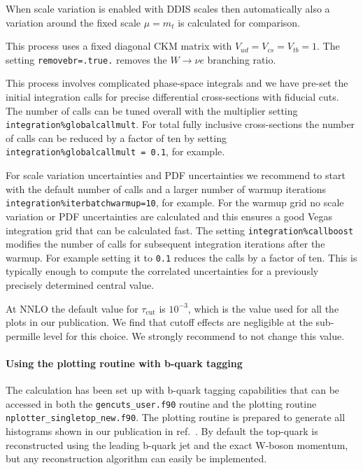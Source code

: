 When scale variation is enabled with DDIS scales then automatically also
a variation around the fixed scale \(\mu=m_t\) is calculated for
comparison.

This process uses a fixed diagonal CKM matrix with
\(V_{ud}=V_{cs}=V_{tb}=1\). The setting \texttt{removebr=.true.} removes
the \(W\to \nu e\) branching ratio.

This process involves complicated phase-space integrals and we have
pre-set the initial integration calls for precise differential
cross-sections with fiducial cuts. The number of calls can be tuned
overall with the multiplier setting
\texttt{integration\%globalcallmult}. For total fully inclusive
cross-sections the number of calls can be reduced by a factor of ten by
setting \texttt{integration\%globalcallmult\ =\ 0.1}, for example.

For scale variation uncertainties and PDF uncertainties we recommend to
start with the default number of calls and a larger number of warmup
iterations \texttt{integration\%iterbatchwarmup=10}, for example. For
the warmup grid no scale variation or PDF uncertainties are calculated
and this ensures a good Vegas integration grid that can be calculated
fast. The setting \texttt{integration\%callboost} modifies the number of
calls for subsequent integration iterations after the warmup. For
example setting it to \texttt{0.1} reduces the calls by a factor of ten.
This is typically enough to compute the correlated uncertainties for a
previously precisely determined central value.

At NNLO the default value for \(\tau_\text{cut}\) is \(10^{-3}\), which
is the value used for all the plots in our publication. We find that
cutoff effects are negligible at the sub-permille level for this choice.
We strongly recommend to not change this value.

\paragraph{Using the plotting routine with b-quark
tagging}\label{using-the-plotting-routine-with-b-quark-tagging}

The calculation has been set up with b-quark tagging capabilities that
can be accessed in both the \texttt{gencuts\_user.f90} routine and the
plotting routine \texttt{nplotter\_singletop\_new.f90}. The plotting
routine is prepared to generate all histograms shown in our publication
in ref.~\cite{Campbell:2020fhf}. By default the top-quark is
reconstructed using the leading b-quark jet and the exact W-boson
momentum, but any reconstruction algorithm can easily be implemented.

